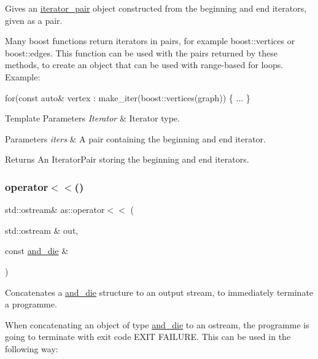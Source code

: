 Gives an \hyperlink{classas_1_1iterator__pair}{iterator\+\_\+pair} object constructed from the beginning and end iterators, given as a pair. 

Many boost functions return iterators in pairs, for example boost\+::vertices or boost\+::edges. This function can be used with the pairs returned by these methods, to create an object that can be used with range-\/based for loops. Example\+:

for(const auto\& vertex \+: make\+\_\+iter(boost\+::vertices(graph)) \{ ... \}


\begin{DoxyTemplParams}{Template Parameters}
{\em Iterator} & Iterator type. \\
\hline
\end{DoxyTemplParams}

\begin{DoxyParams}{Parameters}
{\em iters} & A pair containing the beginning and end iterator. \\
\hline
\end{DoxyParams}
\begin{DoxyReturn}{Returns}
An Iterator\+Pair storing the beginning and end iterators. 
\end{DoxyReturn}
\mbox{\label{namespaceas_a4d891ae352512e1c506d6cd01ff1422c}} 
\subsubsection{\texorpdfstring{operator$<$$<$()}{operator<<()}}
{\footnotesize\ttfamily std\+::ostream\& as\+::operator$<$$<$ (\begin{DoxyParamCaption}\item[{std\+::ostream \&}]{out,  }\item[{const \hyperlink{structas_1_1and__die}{and\+\_\+die} \&}]{ }\end{DoxyParamCaption})\hspace{0.3cm}{\ttfamily [inline]}}



Concatenates a \hyperlink{structas_1_1and__die}{and\+\_\+die} structure to an output stream, to immediately terminate a programme. 

When concatenating an object of type \hyperlink{structas_1_1and__die}{and\+\_\+die} to an ostream, the programme is going to terminate with exit code E\+X\+IT F\+A\+I\+L\+U\+RE. This can be used in the following way\+:

